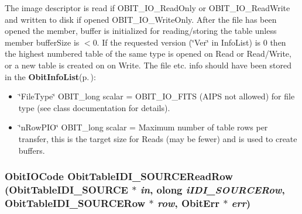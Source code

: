 The image descriptor is read if OBIT\_\-IO\_\-Read\-Only or OBIT\_\-IO\_\-Read\-Write and written to disk if opened OBIT\_\-IO\_\-Write\-Only. After the file has been opened the member, buffer is initialized for reading/storing the table unless member buffer\-Size is $<$0. If the requested version (\char`\"{}Ver\char`\"{} in Info\-List) is 0 then the highest numbered table of the same type is opened on Read or Read/Write, or a new table is created on on Write. The file etc. info should have been stored in the {\bf Obit\-Info\-List}{\rm (p.\,\pageref{structObitInfoList})}: \begin{itemize}
\item \char`\"{}File\-Type\char`\"{} OBIT\_\-long scalar = OBIT\_\-IO\_\-FITS (AIPS not allowed) for file type (see class documentation for details). \item \char`\"{}n\-Row\-PIO\char`\"{} OBIT\_\-long scalar = Maximum number of table rows per transfer, this is the target size for Reads (may be fewer) and is used to create buffers. 
\end{itemize}
\subsubsection{\setlength{\rightskip}{0pt plus 5cm}Obit\-IOCode Obit\-Table\-IDI\_\-SOURCERead\-Row ({\bf Obit\-Table\-IDI\_\-SOURCE} $\ast$ {\em in}, {\bf olong} {\em i\-IDI\_\-SOURCERow}, {\bf Obit\-Table\-IDI\_\-SOURCERow} $\ast$ {\em row}, {\bf Obit\-Err} $\ast$ {\em err})}\label{ObitTableIDI__SOURCE_8c_a22}


